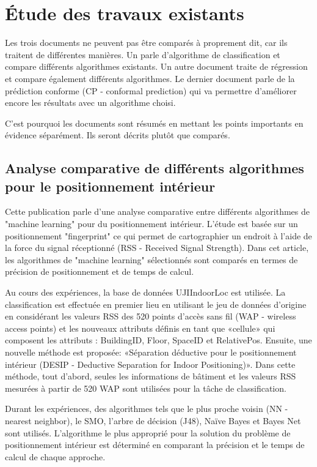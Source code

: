\section{Étude des travaux existants}
Les trois documents ne peuvent pas être comparés à proprement dit, car ils traitent de différentes manières. Un parle d'algorithme de classification et compare différents algorithmes existants. Un autre document traite de régression et compare également différents algorithmes. Le dernier document parle de la prédiction conforme (CP - conformal prediction) qui va permettre d'améliorer encore les résultats avec un algorithme choisi.  

C'est pourquoi les documents sont résumés en mettant les points importants en évidence séparément. Ils seront décrits plutôt que comparés. 

\subsection{Analyse comparative de différents algorithmes pour le positionnement intérieur \cite{ML_algo}}
Cette publication parle d'une analyse comparative entre différents algorithmes de "machine learning" pour du positionnement intérieur. L'étude est basée sur un positionnement "fingerprint" ce qui permet de cartographier un endroit à l'aide de la force du signal réceptionné (RSS - Received Signal Strength).
Dans cet article, les algorithmes de "machine learning" sélectionnés sont comparés en termes de précision de positionnement et de temps de calcul. 

Au cours des expériences, la base de données UJIIndoorLoc est utilisée. La classification est effectuée en premier lieu en utilisant le jeu de données d'origine en considérant les valeurs RSS des 520 points d'accès sans fil (WAP - wireless access points) et les nouveaux attributs définis en tant que «cellule» qui composent les attributs : BuildingID, Floor, SpaceID et RelativePos. Ensuite, une nouvelle méthode est proposée: «Séparation déductive pour le positionnement intérieur (DESIP - Deductive Separation for Indoor Positioning)». Dans cette méthode, tout d'abord, seules les informations de bâtiment et les valeurs RSS mesurées à partir de 520 WAP sont utilisées pour la tâche de classification.

Durant les expériences, des algorithmes tels que le plus proche voisin (NN - nearest neighbor), le SMO, l'arbre de décision (J48), Naïve Bayes et Bayes Net sont utilisés. L’algorithme le plus approprié pour la solution du problème de positionnement intérieur est déterminé en comparant la précision et le temps de calcul de chaque approche.

